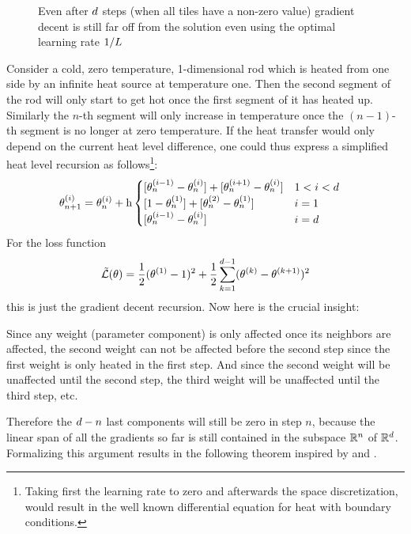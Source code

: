 \begin{figure}[h]
	\centering
	\def\svgwidth{1\textwidth}
	
	\caption{Even after \(d\) steps (when all tiles have a non-zero value)
	gradient decent is still far off from the solution even using the optimal
	learning rate \(1/L\)}
	\label{fig: visualize coloring problem}
\end{figure}
%
Consider a cold, zero temperature, 1-dimensional rod which is heated from one side
by an infinite heat source at temperature one. Then the second segment of the rod
will only start to get hot once the first segment of it has heated up. Similarly
the \(n\)-th segment will only increase in temperature once the \((n-1)\)-th segment
is no longer at zero temperature. If the heat transfer would only depend on the
current heat level difference, one could thus express a simplified heat level
recursion as follows\footnote{
	Taking first the learning rate to zero and afterwards the space discretization, would
	result in the well known differential equation for heat with boundary
	conditions.
}: 
%
\begin{align*}
	\weights_{n+1}^{(i)}
	&= \weights_{n}^{(i)}
	+ \lr 
	\begin{cases}
		[\weights_{n}^{(i-1)} - \weights_{n}^{(i)}] + [\weights_{n}^{(i+1)} - \weights_{n}^{(i)}]
		&  1 < i < \dimension \\
		[1 - \weights_{n}^{(1)}] + [\weights_{n}^{(2)} - \weights_{n}^{(1)}]
		& i = 1 \\
		[\weights_{n}^{(i-1)} - \weights_{n}^{(i)}]
		& i = \dimension
	\end{cases}
\end{align*}
%
For the loss function
%
\begin{align}\label{eq: naive complexity counterexample loss}
	\tilde{\mathcal{L}}(\theta)
	= \frac12 (\theta^{(1)}-1)^2
	+ \frac12 \sum_{k=1}^{d-1} (\theta^{(k)}-\theta^{(k+1)})^2
\end{align}
%
this is just the gradient decent recursion. Now here is the crucial insight:

Since any weight (parameter component) is only affected once its neighbors are
affected, the second weight can not be affected before the second step since
the first weight is only heated in the first step. And since the second weight
will be unaffected until the second step, the third weight will be unaffected
until the third step, etc.

Therefore the \(d - n\) last components will still be zero in
step \(n\), because the linear span of all the gradients so far is still
contained in the subspace \(\mathbb{R}^n\) of \(\mathbb{R}^d\). Formalizing
this argument results in the following theorem inspired by \textcite[Theorem
2.1.7]{nesterovLecturesConvexOptimization2018} and \textcite{gohWhyMomentumReally2017}.

